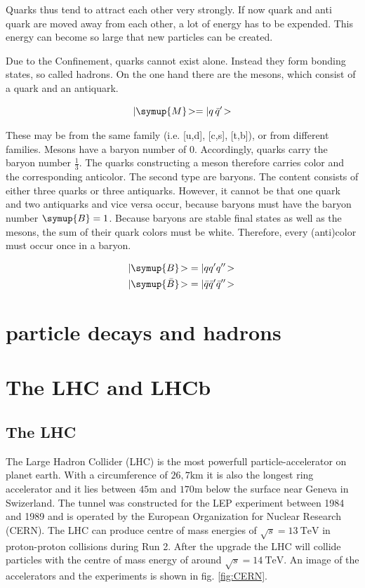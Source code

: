 Quarks thus tend to attract each other very strongly. If now
quark and anti quark are moved away from each other, a lot of energy has to be expended. This energy can become so large that new particles can be created.

Due to the Confinement, quarks cannot exist alone. Instead they form bonding states, so called hadrons. On the one hand there are the mesons, which consist of a quark
and an antiquark.

\begin{equation}
	|\symup{M}\!> = | q\, \bar{q}'\!>
\end{equation}

These may be from the same family (i.e. [u,d], [c,s], [t,b]), or from
different families. Mesons have a baryon number of 0. Accordingly, quarks carry the baryon number $\frac{1}{3}$. The quarks constructing a meson therefore carries color and the corresponding anticolor.
The second type are baryons. The content consists of either three quarks or
three antiquarks. However, it cannot be that one quark and two antiquarks
and vice versa occur, because baryons must have the baryon number $\symup{B} = 1$. Because baryons are stable final states as well as the mesons, the sum of their quark colors must be white. Therefore, every (anti)color must occur once in a baryon.

\begin{align}
	|\symup{B}\!> &= |q q' q''\!> \\
	|\symup{\bar{B}}\!> &= |\bar{q} \bar{q}' \bar{q}''\!> \,
\end{align}

\section{particle decays and hadrons}
\label{sec:decays}

\section{The LHC and LHCb}
\label{sec:lhcandB}

\subsection{The LHC}
The Large Hadron Collider (LHC)\cite{lhcInfo} is the most powerfull particle-accelerator on planet earth. With a circumference of $26,7\si{\kilo\metre}$ it is also the longest ring accelerator and it lies between $45\si{\metre}$ and $170\si{\metre}$ below the surface near Geneva in Swizerland. The tunnel was constructed for the LEP experiment between 1984 and 1989 and is operated by the European Organization for Nuclear Research (CERN). The LHC can produce centre of mass energies of $\sqrt{s} = \SI{13}{\tera\electronvolt}$ in proton-proton collisions during Run 2. After the upgrade the LHC will collide particles with the centre of mass energy of around $\sqrt{s} = \SI{14}{\tera\electronvolt}$.
An image of the accelerators and the experiments is shown in fig. \ref{fig:CERN}\cite{facilityCERN}.

